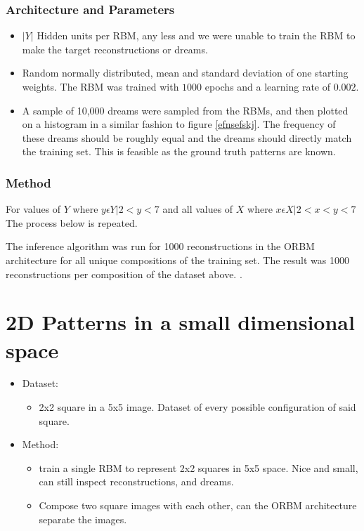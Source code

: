 \subsubsection{Architecture and Parameters}
\begin{itemize}
  \item $|Y|$ Hidden units per RBM, any less and we were unable to train the RBM to make the target reconstructions or dreams.
  \item Random normally distributed, mean and standard deviation of one starting weights. The RBM was trained with $1000$ epochs and a learning rate of $0.002$.
  \item A sample of 10,000 dreams were sampled from the RBMs, and then plotted on a histogram in a similar fashion to figure \ref{efnsefskj}. The frequency of these dreams should be roughly equal and the dreams should directly match the training set. This is feasible as the ground truth patterns are known.
\end{itemize}


\subsubsection{Method}

For values of $Y$ where $y \epsilon Y \big| 2 < y < 7$ and all values of $X$ where $x \epsilon X \big| 2 < x < y < 7 $ The process below is repeated.

The inference algorithm was run for 1000 reconstructions in the ORBM architecture for all unique compositions of the training set. The result was 1000 reconstructions per composition of the dataset above. .



\section{2D Patterns in a small dimensional space}
\begin{itemize}
    \item Dataset:
    \begin{itemize}
      \item 2x2 square in a 5x5 image. Dataset of every possible configuration of said square.
    \end{itemize}
    \item Method:
    \begin{itemize}
      \item train a single RBM to represent 2x2 squares in 5x5 space. Nice and small, can still inspect reconstructions, and dreams.
      \item Compose two square images with each other, can the ORBM architecture separate the images.
    \end{itemize}
  \end{itemize}

